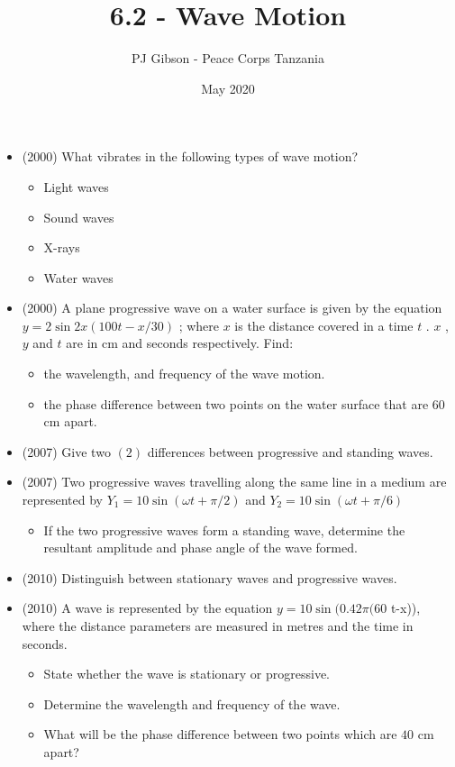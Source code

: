 \documentclass{article}
\title{\textbf{6.2 - Wave Motion}}
\author{PJ Gibson - Peace Corps Tanzania}
\date{May 2020}
\begin{document}
\maketitle

\begin{itemize}
\item (2000)  What vibrates in the following types of wave motion?
 \begin{itemize}
\item Light waves
\item Sound waves
\item X-rays
\item Water waves
\end{itemize}
\item (2000)  A plane progressive wave on a water surface is given by the equation $ y=2 \sin 2x(100t -x/30)$ ; where $ x$ is the distance covered in a time $ t$ . $ x$ , $ y$ and $ t$ are in cm and seconds respectively.  Find:
 \begin{itemize}
\item the wavelength, and frequency of the wave motion.
\item the phase difference between two points on the water surface that are $ 60$ cm apart.
\end{itemize}
\item (2007)  Give two $ (2)$ differences between progressive and standing waves.
\item (2007)  Two progressive waves travelling along the same line in a medium are represented by $ Y_{1}=10 \sin(\omega t +\pi/2)$ and $ Y_{2}=10 \sin(\omega t +\pi/6)$
 \begin{itemize}
\item If the two progressive waves form a standing wave, determine the resultant amplitude and phase angle of the wave formed.
\end{itemize}
\item (2010)  Distinguish between stationary waves and progressive waves.
\item (2010)  A wave is represented by the equation $ y=10 \sin(0.42\pi(60$ t-x)), where the distance parameters are measured in metres and the time in seconds.
 \begin{itemize}
\item State whether the wave is stationary or progressive.
\item Determine the wavelength and frequency of the wave.
\item What will be the phase difference between two points which are $ 40$ cm apart? 

\end{itemize}
\end{itemize}
\end{document}
